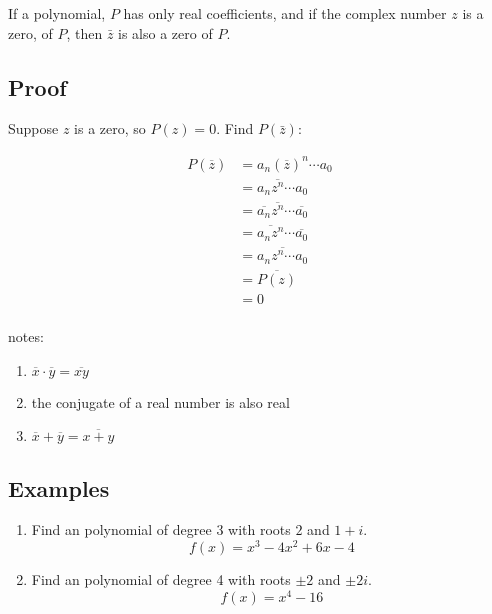 \documentclass{exam}
\begin{document}
If a polynomial, $P$ has only real coefficients, and if the complex number $z$ is a zero, of $P$, then
$\bar{z}$ is also a zero of $P$.

\subsection{Proof}

Suppose $z$ is a zero, so $P(z) = 0$.  Find $P(\bar{z})$:

\begin{align*}
  P(\overline{z}) &= a_n (\overline{z})^n \cdots a_0 \\
                  &= a_n \overline{z^n} \cdots a_0                       \tag{1} \\
                  &= \overline{a_n} \overline{z^n} \cdots \overline{a_0} \tag{2} \\
                  &= \overline{a_n z^n} \cdots \overline{a_0}            \tag{1} \\
                  &= \overline{a_n z^n \cdots a_0}                       \tag{3} \\
                  &= \overline{P(z)} \\
                  &= 0 \\
\end{align*}

notes:
\begin{enumerate}
  \item $\overline{x} \cdot \overline{y} = \overline{xy}$
  \item the conjugate of a real number is also real
  \item $\overline{x} + \overline{y} = \overline{x + y}$
\end{enumerate}

\subsection{Examples}

\begin{enumerate}
  \item Find an polynomial of degree 3 with roots $2$ and $1 + i$.
    \[
      f(x) = x^3-4 x^2+6 x-4
    \]

  \item Find an polynomial of degree 4 with roots $\pm 2$ and $\pm 2i$.
    \[
      f(x) = x^4 - 16
    \]
\end{enumerate}

\pagebreak
\end{document}
